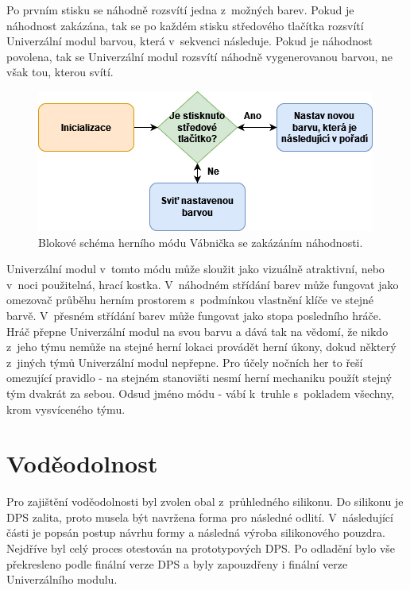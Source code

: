 Po prvním stisku se náhodně rozsvítí jedna z~možných barev. Pokud je náhodnost zakázána, tak se po každém stisku středového tlačítka rozsvítí Univerzální modul barvou, která v~sekvenci následuje. Pokud 
je náhodnost povolena, tak se Univerzální modul rozsvítí náhodně vygenerovanou barvou, ne však tou, kterou svítí. 

\begin{figure}[!h]
  \begin{center}
    \includegraphics[scale=0.75]{obrazky/Vabnicka_diagram.png}
  \end{center}
  \caption[Blokové schéma herního módu Vábnička se zakázáním náhodnosti]{Blokové schéma herního módu Vábnička se zakázáním náhodnosti.}
\end{figure}

Univerzální modul v~tomto módu může sloužit jako vizuálně atraktivní, nebo v~noci použitelná, hrací kostka. V~náhodném střídání barev může fungovat jako omezovač průběhu herním prostorem s~podmínkou 
vlastnění klíče ve stejné barvě. V~přesném střídání barev může fungovat jako stopa posledního hráče. Hráč přepne Univerzální modul na svou barvu a dává tak na vědomí, že nikdo z~jeho týmu nemůže na 
stejné herní lokaci provádět herní úkony, dokud některý z~jiných týmů Univerzální modul nepřepne. Pro účely nočních her to řeší omezující pravidlo - na stejném stanovišti nesmí herní mechaniku použít 
stejný tým dvakrát za sebou. Odsud jméno módu - vábí k~truhle s~pokladem všechny, krom vysvíceného týmu.

\chapter{Voděodolnost}
Pro zajištění voděodolnosti byl zvolen obal z~průhledného silikonu. Do silikonu je DPS zalita, proto musela být navržena forma pro následné odlití. V~následující části je popsán postup 
návrhu formy a následná výroba silikonového pouzdra. Nejdříve byl celý proces otestován na prototypových DPS. Po odladění bylo vše překresleno podle finální verze DPS a byly zapouzdřeny
i finální verze Univerzálního modulu.  

